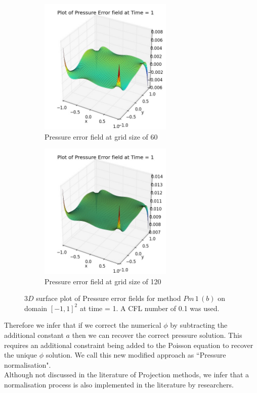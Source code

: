 \begin{figure}[H]
	\centering
	\begin{subfigure}[t]{2.5in}
		\centering
		\includegraphics[width=2.5in]{figures/Pm1b_pf2_P_error_t_1_grid_60 - Copy.jpg}
		\caption{Pressure error field at grid size of 60}\label{fig:6.19a}		
	\end{subfigure}
	\quad
	\begin{subfigure}[t]{2.5in}
		\centering
		\includegraphics[width=2.5in]{figures/Pm1b_pf2_P_error_t_1_grid_120.jpg}
		\caption{Pressure error field at grid size of 120}\label{fig:6.19b}
	\end{subfigure}
	\caption{$3D$ surface plot of Pressure error fields for method $Pm\,1\,(b)$ on domain $[-1,1]^2$ at time = 1. A CFL number of 0.1 was used.}\label{fig:6.16}
\end{figure}

Therefore we infer that if we correct the numerical $\phi$ by subtracting the additional constant $a$ then we can recover the correct pressure solution. This requires an additional constraint being added to the Poisson equation to recover the unique $\phi$ solution. We call this new modified approach as ``Pressure normalisation".\\

Although not discussed in the literature of Projection methods, we infer that a normalisation process is also implemented in the literature by researchers.\\

